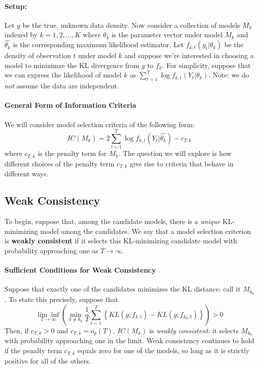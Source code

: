 \paragraph{Setup:}
Let $g$ be the true, unknown data density. 
Now consider a collection of models $M_k$ indexed by $k = 1, 2, \hdots, K$ where $\theta_k$ is the parameter vector under model $M_k$ and $\widehat{\theta_k}$ is the corresponding maximum likelihood estimator.
Let $f_{k,t}(y_t|\theta_k)$ be the density of observation $t$ under model $k$ and suppose we're interested in choosing a model to mininimze the KL divergence from $g$ to $f_k$.
For simplicity, suppose that we can express the likelihood of model $k$ as $\sum_{t=1}^T \log f_{k,t}(Y_t| \theta_k)$. 
Note: we do \emph{not} assume the data are independent. 


\paragraph{General Form of Information Criteria}
We will consider model selection criteria of the following form:
	$$IC(M_k) = 2 \sum_{t=1}^T \log f_{k,t}(Y_t| \widehat{\theta_k}) - c_{T,k}$$
where $c_{T,k}$ is the penalty term for $M_k$. 
The question we will explore is how different choices of the penalty term $c_{T,k}$ give rise to criteria that behave in different ways. 



\subsection{Weak Consistency}
To begin, suppose that, among the candidate models, there is a \emph{unique} KL-minimizing model among the candidates.
We say that a model selection criterion is \textbf{weakly consistent} if it selects this KL-minimizing candidate model with probability approaching one as $T\rightarrow \infty$.

\paragraph{Sufficient Conditions for Weak Consistency}
Suppose that exactly one of the candidates minimizes the KL distance: call it $M_{k_0}$. 
To state this precisely, suppose that
	$$\underset{T\rightarrow \infty}{\lim\inf}\left(\underset{k \neq k_0}{\min} \frac{1}{T}\sum_{t = 1}^T \left\{ KL(g; f_{k,t}) - KL(g;f_{k_0,t}) \right\} \right) > 0$$
Then, if $c_{T,k}> 0$ and $c_{T,k} = o_p(T)$, $IC(M_k)$ is \emph{weakly consistent}: it selects $M_{k_0}$ with probability approaching one in the limit.
Weak consistency continues to hold if the penalty term $c_{T,k}$ equals zero for one of the models, so long as it is strictly positive for all of the others.

